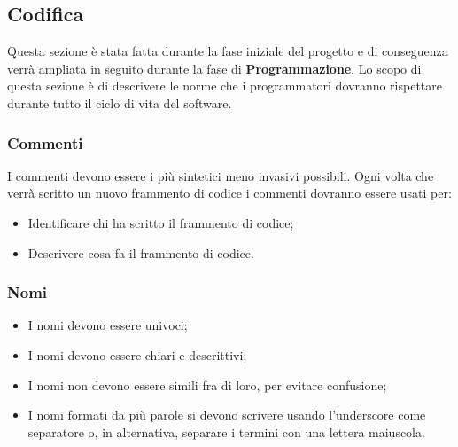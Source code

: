 \documentclass[a4paper, oneside, dvipsnames, table]{article}
\begin{document}
\subsection{Codifica}

Questa sezione è stata fatta durante la fase iniziale del progetto e di conseguenza verrà ampliata in seguito durante la fase di \textbf{Programmazione}.
Lo scopo di questa sezione è di descrivere le norme che i programmatori dovranno rispettare durante tutto il ciclo di vita del software. 

\subsubsection{Commenti}
I commenti devono essere i più sintetici meno invasivi possibili.
Ogni volta che verrà scritto un nuovo frammento di codice i commenti dovranno essere usati per:
\begin{itemize}
\item Identificare chi ha scritto il frammento di codice;
\item Descrivere cosa fa il frammento di codice.
\end{itemize}

\subsubsection{Nomi}
\begin{itemize}
\item I nomi devono essere univoci;
\item I nomi devono essere chiari e descrittivi;
\item I nomi non devono essere simili fra di loro, per evitare confusione;
\item I nomi formati da più parole si devono scrivere usando l'underscore come separatore o, in alternativa, separare i termini con una lettera maiuscola.
\end{itemize}
\end{document}
